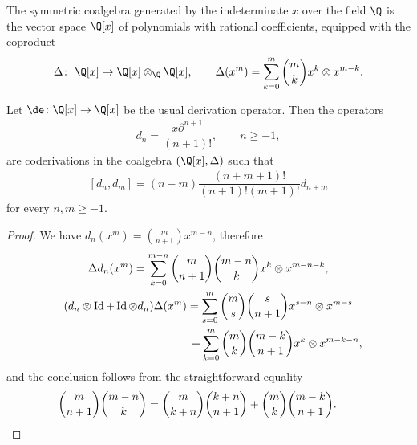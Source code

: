 The symmetric coalgebra generated by the indeterminate $x$ over the f\/ield $\Q$ is the vector space $\Q[x]$ of polynomials with rational coef\/f\/icients, equipped with the coproduct
\begin{gather*} \Delta\colon \ \Q[x]\to \Q[x]\otimes_{\Q} \Q[x],\qquad \Delta(x^m)=\sum_{k=0}^{m}
\binom{m}{k}x^k\otimes x^{m-k}.\end{gather*}

\begin{Lemma}
Let $\de\colon \Q[x]\to \Q[x]$ be the usual derivation operator. Then the operators
\begin{gather*}d_n=\dfrac{x\partial^{n+1}}{ (n+1)! },\qquad n\ge -1,\end{gather*}
are coderivations in the coalgebra
$(\Q[x],\Delta)$ such that
\begin{gather}\label{equ.bracketdenne}
[d_n,d_m]=(n-m)\dfrac{(n+m+1)!}{(n+1)!(m+1)!}
d_{n+m} \end{gather}
for every $n,m\ge -1$.
\end{Lemma}

\begin{proof}
We have $d_n(x^m)=\binom{m}{n+1}x^{m-n}$, therefore
\begin{gather*}
\Delta d_n(x^m)= \sum_{k=0}^{m-n}\dbinom{m}{n+1}\binom{m-n}{k}x^k\otimes x^{m-n-k},\\
(d_n\otimes \operatorname{Id}+\operatorname{Id}\otimes d_n)\Delta(x^m)=
\sum_{s=0}^{m}\dbinom{m}{s}\binom{s}{n+1}x^{s-n}\otimes x^{m-s} \\
\hphantom{(d_n\otimes \operatorname{Id}+\operatorname{Id}\otimes d_n)\Delta(x^m)=}{} +
\sum_{k=0}^{m}\dbinom{m}{k}\binom{m-k}{n+1}x^{k}\otimes x^{m-k-n},
\end{gather*}
and the conclusion follows from the straightforward equality
\begin{gather*} \dbinom{m}{n+1}\binom{m-n}{k}=\dbinom{m}{k+n}\binom{k+n}{n+1}+
\dbinom{m}{k}\binom{m-k}{n+1} .\tag*{\qed}
\end{gather*}
\renewcommand{\qed}{}
\end{proof}
